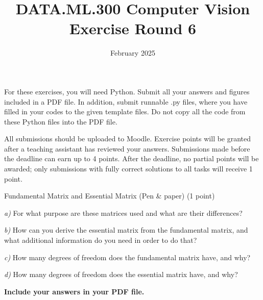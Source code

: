 \documentclass[12pt]{article} %
\title{DATA.ML.300 Computer Vision\\ Exercise Round 6}
\date{\vspace{-5mm} February 2025}
\date{} %
\newenvironment{exercise}[2][Task]{\begin{trivlist}
\item[\hskip \labelsep {\bfseries #1}\hskip \labelsep {\bfseries #2.}]}{\end{trivlist}}
\begin{document}
\maketitle


\noindent For these exercises, you will need Python. Submit all your answers and figures included in
a PDF file. In addition, submit runnable .py files, where you have filled in your codes to
the given template files. Do not copy all the code from these Python files into the PDF file.
\newline

\noindent All submissions should be uploaded to Moodle. Exercise points will be granted after
a teaching assistant has reviewed your answers. Submissions made before the deadline
can earn up to 4 points. After the deadline, no partial points will be awarded; only
submissions with fully correct solutions to all tasks will receive 1 point.
\newline


\begin{exercise}{1} 
Fundamental Matrix and Essential Matrix (Pen \& paper) (1 point)

\noindent 

\noindent \textit{a)} For what purpose are these matrices used and what are their differences?

\noindent \textit{b)} How can you derive the essential matrix from the fundamental matrix, and what additional information do you need in order to do that?

\noindent \textit{c)} How many degrees of freedom does the fundamental matrix have, and why?

\noindent \textit{d)} How many degrees of freedom does the essential matrix have, and why?

\noindent \textbf{Include your answers in your PDF file.}
\end{exercise}
\end{document}
